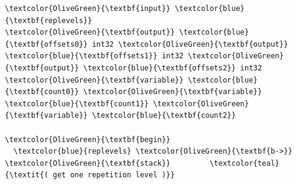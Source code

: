 \documentclass{webofc}
\begin{document}
\begin{Verbatim}[commandchars=\\\{\}]
\textcolor{OliveGreen}{\textbf{input}} \textcolor{blue}{\textbf{replevels}}
\textcolor{OliveGreen}{\textbf{output}} \textcolor{blue}{\textbf{offsets0}} int32 \textcolor{OliveGreen}{\textbf{output}} \textcolor{blue}{\textbf{offsets1}} int32 \textcolor{OliveGreen}{\textbf{output}} \textcolor{blue}{\textbf{offsets2}} int32
\textcolor{OliveGreen}{\textbf{variable}} \textcolor{blue}{\textbf{count0}} \textcolor{OliveGreen}{\textbf{variable}} \textcolor{blue}{\textbf{count1}} \textcolor{OliveGreen}{\textbf{variable}} \textcolor{blue}{\textbf{count2}}

\textcolor{OliveGreen}{\textbf{begin}}
  \textcolor{blue}{replevels} \textcolor{OliveGreen}{\textbf{b->}} \textcolor{OliveGreen}{\textbf{stack}}         \textcolor{teal}{\textit{( get one repetition level )}}


\end{Verbatim}
\end{document}
